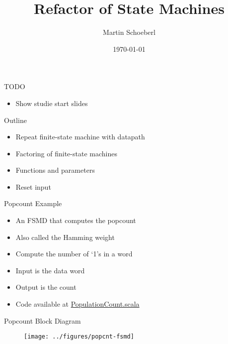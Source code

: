 

\newif\ifbook


\title{Refactor of State Machines}
\author{Martin Schoeberl}
\date{\today}



\begin{frame}
\titlepage
\end{frame}

\begin{frame}[fragile]{TODO}
\begin{itemize}
\item Show studie start slides
\end{itemize}
\end{frame}

\begin{frame}[fragile]{Outline}
\begin{itemize}
\item Repeat finite-state machine with datapath
\item Factoring of finite-state machines
\item Functions and parameters
\item Reset input
\end{itemize}
\end{frame}

\begin{frame}[fragile]{Popcount Example}
\begin{itemize}
\item An FSMD that computes the popcount
\item Also called the Hamming weight
\item Compute the number of `1's in a word
\item Input is the data word
\item Output is the count
\item Code available at \href{https://github.com/schoeberl/chisel-book/blob/master/src/main/scala/PopulationCount.scala}{PopulationCount.scala}
\end{itemize}
\end{frame}

\begin{frame}[fragile]{Popcount Block Diagram}

\begin{figure}
  \texttt{[image: ../figures/popcnt-fsmd]}
\end{figure}
\end{frame}


